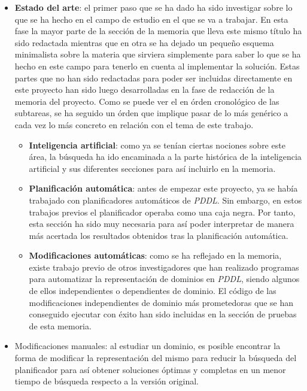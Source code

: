 \documentclass{article}
\begin{document}
    \newpage
    
    
    \begin{itemize}
        \item \textbf{Estado del arte}: el primer paso que se ha dado ha sido investigar sobre lo que se ha hecho en el campo de estudio en el que se va a trabajar. En esta fase la mayor parte de la sección de la memoria que lleva este mismo título ha sido redactada mientras que en otra se ha dejado un pequeño esquema minimalista sobre la materia que sirviera simplemente para saber lo que se ha hecho en este campo para tenerlo en cuenta al implementar la solución. Estas partes que no han sido redactadas para poder ser incluidas directamente en este proyecto han sido luego desarrolladas en la fase de redacción de la memoria del proyecto. Como se puede ver el en órden cronológico de las subtareas, se ha seguido un órden que implique pasar de lo más genérico a cada vez lo más concreto en relación con el tema de este trabajo.
        
        \begin{itemize}
            \item \textbf{Inteligencia artificial}: como ya se tenían ciertas nociones sobre este área, la búsqueda ha ido encaminada a la parte histórica de la inteligencia artificial y sus diferentes secciones para así incluirlo en la memoria.
            \item \textbf{Planificación automática}: antes de empezar este proyecto, ya se había trabajado con planificadores automáticos de \textit{PDDL}. Sin embargo, en estos trabajos previos el planificador operaba como una caja negra. Por tanto, esta sección ha sido muy necesaria para así poder interpretar de manera más acertada los resultados obtenidos tras la planificación automática.
            \item \textbf{Modificaciones automáticas}: como se ha reflejado en la memoria, existe trabajo previo de otros investigadores que han realizado programas para automatizar la representación de dominios en \textit{PDDL}, siendo algunos de ellos independientes o dependientes de dominio. El código de las modificaciones independientes de dominio más prometedoras que se han conseguido ejecutar con éxito han sido incluidas en la sección de pruebas de esta memoria.
        \end{itemize}
        
        \item Modificaciones manuales: al estudiar un dominio, es posible encontrar la forma de modificar la representación del mismo para reducir la búsqueda del planificador para así obtener soluciones óptimas y completas en un menor tiempo de búsqueda respecto a la versión original.
        

\end{itemize}
\end{document}
